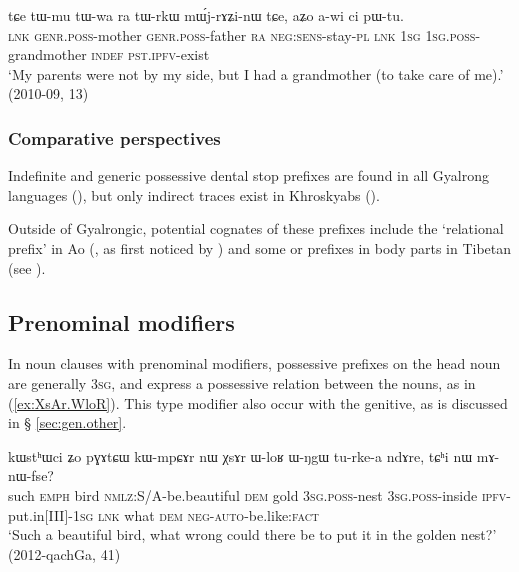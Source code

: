 \begin{exe}
\ex  \label{ex:tWrkW.mWjrAZinW}
\gll tɕe tɯ-mu tɯ-wa ra tɯ-rkɯ mɯ́j-rɤʑi-nɯ tɕe, aʑo a-wi ci pɯ-tu. \\
\textsc{lnk} \textsc{genr}.\textsc{poss}-mother  \textsc{genr}.\textsc{poss}-father \textsc{ra}  \textsc{neg}:\textsc{sens}-stay-\textsc{pl} \textsc{lnk} \textsc{1sg} \textsc{1sg}.\textsc{poss}-grandmother \textsc{indef} \textsc{pst}.\textsc{ipfv}-exist \\ 
\glt `My parents were not by my side, but I had a grandmother (to take care of me).' (2010-09, 13)
\end{exe}

\subsubsection{Comparative perspectives} \label{sec:indef.t.comparative}
Indefinite and generic possessive dental stop prefixes are found in all Gyalrong languages (\citealt{jackson98morphology}), but only indirect traces exist in Khroskyabs  (\citealt[155]{lai17khroskyabs}). 

Outside of Gyalrongic, potential cognates of these prefixes include the `relational prefix'  in Ao (\citealt[84-85]{coupe07mongsen}, as first noticed by \citealt[141-2]{wolfenden29outlines}) and some  or  prefixes in body parts in Tibetan (see \citealt{jacques14snom}).

\subsection{Prenominal modifiers} \label{sec:possessive.prefixes.prenominal}
In noun clauses with prenominal modifiers, possessive prefixes on the head noun are generally \textsc{3sg}, and express a possessive relation between the nouns, as in (\ref{ex:XsAr.WloR}).  This type modifier also occur with the genitive, as is discussed in § \ref{sec:gen.other}.

\begin{exe}
\ex \label{ex:XsAr.WloR}
\gll kɯstʰɯci ʑo pɣɤtɕɯ kɯ-mpɕɤr nɯ χsɤr ɯ-loʁ ɯ-ŋgɯ tu-rke-a ndɤre, tɕʰi nɯ mɤ-nɯ-fse? \\
such \textsc{emph} bird \textsc{nmlz}:S/A-be.beautiful \textsc{dem} gold \textsc{3sg}.\textsc{poss}-nest \textsc{3sg}.\textsc{poss}-inside \textsc{ipfv}-put.in[III]-\textsc{1sg} \textsc{lnk} what \textsc{dem} \textsc{neg}-\textsc{auto}-be.like:\textsc{fact} \\
\glt `Such a beautiful bird, what wrong could there be to put it in the golden nest?' (2012-qachGa, 41)
\end{exe}

